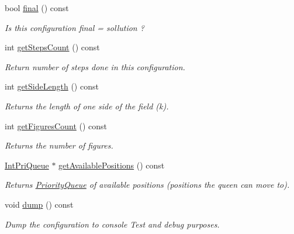 \begin{DoxyCompactItemize}
bool \hyperlink{class_configuration_ae2ed3d89437a75e3aee87f43dbdc4a2c}{final} () const 
\begin{DoxyCompactList}\small\item\em Is this configuration final = sollution ? \item\end{DoxyCompactList}\item 
int \hyperlink{class_configuration_a899f2320c29a361457f95262eff51571}{getStepsCount} () const 
\begin{DoxyCompactList}\small\item\em Return number of steps done in this configuration. \item\end{DoxyCompactList}\item 
int \hyperlink{class_configuration_a6c683c5112b783922f924446cb5a8e5b}{getSideLength} () const 
\begin{DoxyCompactList}\small\item\em Returns the length of one side of the field (k). \item\end{DoxyCompactList}\item 
int \hyperlink{class_configuration_a309ee0fb70a3fbbdeb82a2e5f856e9f5}{getFiguresCount} () const 
\begin{DoxyCompactList}\small\item\em Returns the number of figures. \item\end{DoxyCompactList}\item 
\hyperlink{class_priority_queue}{IntPriQueue} $\ast$ \hyperlink{class_configuration_aea495abb2084891fef34c972b586609a}{getAvailablePositions} () const 
\begin{DoxyCompactList}\small\item\em Returns \hyperlink{class_priority_queue}{PriorityQueue} of available positions (positions the queen can move to). \item\end{DoxyCompactList}\item 
void \hyperlink{class_configuration_a154b6bf5556ec7e5953652171876dca4}{dump} () const 
\begin{DoxyCompactList}\small\item\em Dump the configuration to console Test and debug purposes. \item\end{DoxyCompactList}\end{DoxyCompactItemize}


